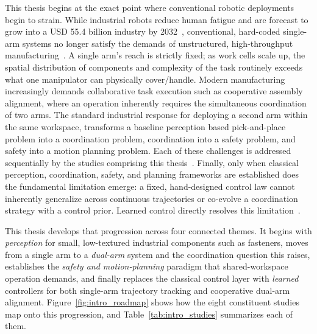This thesis begins at the exact point where conventional robotic deployments begin to strain. While industrial robots reduce human fatigue and are forecast to grow into a USD 55.4 billion industry by 2032~\citep{develop2024robotic}, conventional, hard-coded single-arm systems no longer satisfy the demands of unstructured, high-throughput manufacturing~\citep{abbas2023systematic}. A single arm's reach is strictly fixed; as work cells scale up, the spatial distribution of components and complexity of the task routinely exceeds what one manipulator can physically cover/handle. Modern manufacturing increasingly demands collaborative task execution such as cooperative assembly alignment, where an operation inherently requires the simultaneous coordination of two arms. The standard industrial response for deploying a second arm within the same workspace, transforms a baseline perception based pick-and-place problem into a coordination problem, coordination into a safety problem, and safety into a motion planning problem. Each of these challenges is addressed sequentially by the studies comprising this thesis~\citep{surya2025iapf,sk2025competitive}. Finally, only when classical perception, coordination, safety, and planning frameworks are established does the fundamental limitation emerge: a fixed, hand-designed control law cannot inherently generalize across continuous trajectories or co-evolve a coordination strategy with a control prior. Learned control directly resolves this limitation~\citep{sk2025diktracking,sk2026priorguided}.

This thesis develops that progression across four connected themes. It begins with
\emph{perception} for small, low-textured industrial components such as fasteners, moves from a single arm to a \emph{dual-arm} system and the coordination question this raises, establishes the \emph{safety and motion-planning} paradigm that shared-workspace operation demands, and finally replaces the classical control layer with \emph{learned} controllers for both single-arm trajectory tracking and cooperative dual-arm alignment. Figure~\ref{fig:intro_roadmap} shows how the eight constituent studies map onto this progression, and Table~\ref{tab:intro_studies} summarizes each of them.

